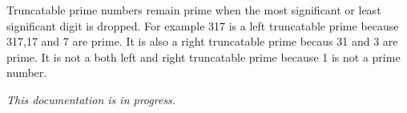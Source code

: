 \documentclass[10pt]{article}
\begin{document}
\vspace*{0.2in}

\begin{flushleft}
{\Large
\textbf{}
}

\vspace{12pt}
Truncatable prime numbers remain prime when the most significant or
least significant digit is dropped.  For example 317 is a left truncatable
prime because 317,17 and 7 are prime.  It is also a right truncatable 
prime becaus 31 and 3 are prime.  It is not a both left and right
truncatable prime because 1 is not a prime number.

\vspace{12pt}
{\it This documentation is in progress.}

\end{flushleft}
\end{document}

